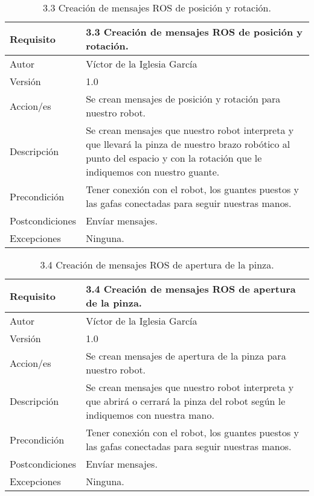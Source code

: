 \begin{table}[h]
    \centering
    \begin{tabular}{| m{3cm} | m{8cm} |}
    \hline
        Requisito & 3.3 Creación de mensajes ROS de posición y rotación.\\ \hline
       Autor  &  Víctor de la Iglesia García \\ \hline
        Versión & 1.0 \\ \hline
        Accion/es & Se crean mensajes de posición y rotación para nuestro robot.\\ \hline
         Descripción & Se crean mensajes que nuestro robot interpreta y que llevará la pinza de nuestro brazo robótico al punto del espacio y con la rotación que le indiquemos con nuestro guante. \\ \hline
        Precondición & Tener conexión con el robot, los guantes puestos y las gafas conectadas para seguir nuestras manos. \\ \hline
        Postcondiciones & Envíar mensajes. \\ \hline
        Excepciones & Ninguna. \\ \hline
    \end{tabular}
    \caption{3.3 Creación de mensajes ROS de posición y rotación.}
    \label{3.3 Creación de mensajes ROS de posición y rotación.}
\end{table}

\begin{table}[h]
    \centering
    \begin{tabular}{| m{3cm} | m{8cm} |}
    \hline
        Requisito & 3.4 Creación de mensajes ROS de apertura de la pinza.\\ \hline
       Autor  &  Víctor de la Iglesia García \\ \hline
        Versión & 1.0 \\ \hline
        Accion/es & Se crean mensajes de apertura de la pinza para nuestro robot.\\ \hline
         Descripción & Se crean mensajes que nuestro robot interpreta y que abrirá o cerrará la pinza del robot según le indiquemos con nuestra mano. \\ \hline
        Precondición & Tener conexión con el robot, los guantes puestos y las gafas conectadas para seguir nuestras manos. \\ \hline
        Postcondiciones & Envíar mensajes. \\ \hline
        Excepciones & Ninguna. \\ \hline
    \end{tabular}
    \caption{3.4 Creación de mensajes ROS de apertura de la pinza.}
    \label{3.4 Creación de mensajes ROS de apertura de la pinza.}
\end{table}

